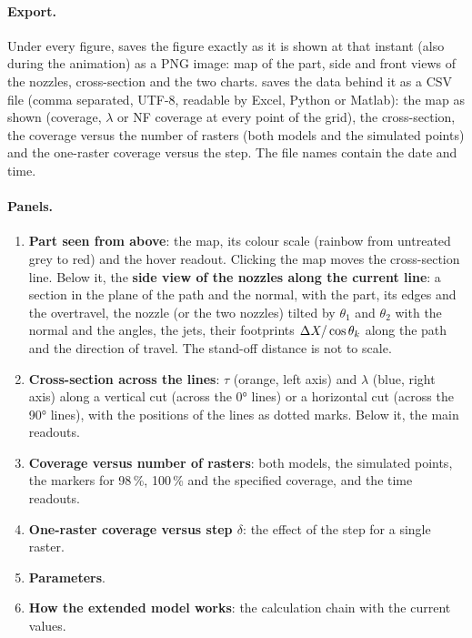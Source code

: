 \documentclass[11pt,a4paper]{article}
\begin{document}
\paragraph{Export.} Under every figure,  saves the figure exactly as it is shown at that instant (also during the animation) as a PNG image: map of the part, side and front views of the nozzles, cross-section and the two charts.  saves the data behind it as a CSV file (comma separated, UTF-8, readable by Excel, Python or Matlab): the map as shown (coverage, $\lambda$ or NF coverage at every point of the grid), the cross-section, the coverage versus the number of rasters (both models and the simulated points) and the one-raster coverage versus the step. The file names contain the date and time.

\paragraph{Panels.}
\begin{enumerate}[nosep]
\item \textbf{Part seen from above}: the map, its colour scale (rainbow from untreated grey to red) and the hover readout. Clicking the map moves the cross-section line. Below it, the \textbf{side view of the nozzles along the current line}: a section in the plane of the path and the normal, with the part, its edges and the overtravel, the nozzle (or the two nozzles) tilted by $\theta_1$ and $\theta_2$ with the normal and the angles, the jets, their footprints $\Delta X/\cos\theta_k$ along the path and the direction of travel. The stand-off distance is not to scale.
\item \textbf{Cross-section across the lines}: $\tau$ (orange, left axis) and $\lambda$ (blue, right axis) along a vertical cut (across the 0° lines) or a horizontal cut (across the 90° lines), with the positions of the lines as dotted marks. Below it, the main readouts.
\item \textbf{Coverage versus number of rasters}: both models, the simulated points, the markers for 98\,\%, 100\,\% and the specified coverage, and the time readouts.
\item \textbf{One-raster coverage versus step $\delta$}: the effect of the step for a single raster.
\item \textbf{Parameters}.
\item \textbf{How the extended model works}: the calculation chain with the current values.
\end{enumerate}
\end{document}
